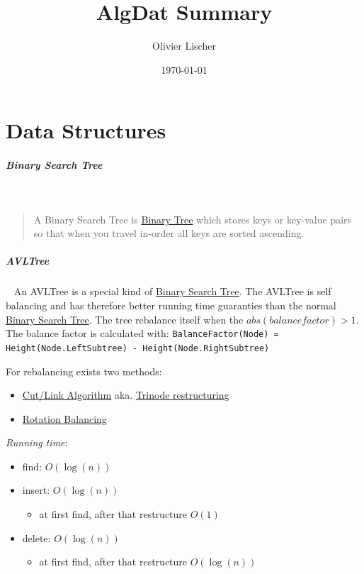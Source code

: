 \documentclass[11pt,twoside,twocolumn,landscape]{article}
\author{Olivier Lischer}
\date{\today}
\title{AlgDat Summary}
\begin{document}
\pagestyle{fancy}
\fancyhf{}
\fancyfoot[CE,CO]{\leftmark}
\fancyfoot[R]{\thepage}

\tableofcontents
\newpage


\section{Data Structures}
\label{sec:orgca462ea}
\subparagraph{Binary Search Tree} \
\label{sec:orgbdbbcd1}
\begin{quote}
A Binary Search Tree is \href{../../../roam/20210806225200-binary_tree.org}{Binary Tree} which stores keys or key-value pairs so
that when you travel in-order all keys are sorted ascending.
\end{quote}

\subparagraph{AVLTree} \
\label{sec:orge9f4417}
An AVLTree is a special kind of \href{../../../roam/20211008140953-binary_search_tree.org}{Binary Search Tree}.
The AVLTree is self balancing and has therefore better running time guaranties than the normal \href{../../../roam/20211008140953-binary_search_tree.org}{Binary Search Tree}.
The tree rebalance itself when the \(abs(balance factor) > 1\).
The balance factor is calculated with: \texttt{BalanceFactor(Node) = Height(Node.LeftSubtree) - Height(Node.RightSubtree)}


For rebalancing exists two methods:
\begin{itemize}
\item \href{../../../roam/20211008144714-cut_link_algorithm.org}{Cut/Link Algorithm} aka. \href{../../../roam/20211008144714-cut_link_algorithm.org}{Trinode restructuring}
\item \href{../../../roam/20211008145521-rotation_balancing.org}{Rotation Balancing}
\end{itemize}

\emph{Running time}:
\begin{itemize}
\item find: \(O(\log (n))\)
\item insert: \(O(\log (n))\)
\begin{itemize}
\item at first find, after that restructure \(O(1)\)
\end{itemize}
\item delete: \(O(\log (n))\)
\begin{itemize}
\item at first find, after that restructure \(O(\log (n))\)
\end{itemize}
\end{itemize}
\end{document}
